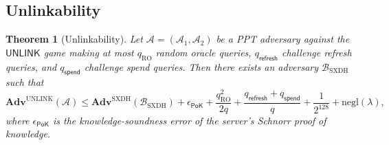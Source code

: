 \documentclass[11pt]{article}
\theoremstyle{definitionstyle}
\newtheorem{theorem}{Theorem}[section]
\theoremstyle{plain}
\newcommand{\advantage}[1]{\mathbf{Adv}^{\mathrm{#1}}}
\newcommand{\negl}{\mathrm{negl}}
\begin{document}
\subsection{Unlinkability}

\begin{theorem}[Unlinkability]
Let $\mathcal{A} = (\mathcal{A}_1, \mathcal{A}_2)$ be a PPT adversary against the $\mathsf{UNLINK}$ game making at most $q_{\text{RO}}$ random oracle queries, $q_{\mathsf{refresh}}$ challenge refresh queries, and $q_{\mathsf{spend}}$ challenge spend queries. Then there exists an adversary $\mathcal{B}_{\text{SXDH}}$ such that
\[
\advantage{UNLINK}(\mathcal{A}) \le \advantage{SXDH}(\mathcal{B}_{\text{SXDH}}) + \epsilon_{\mathsf{PoK}} + \frac{q_{\text{RO}}^2}{2q} + \frac{q_{\mathsf{refresh}}+q_{\mathsf{spend}}}{q} + \frac{1}{2^{128}} + \negl(\lambda),
\]
where $\epsilon_{\mathsf{PoK}}$ is the knowledge-soundness error of the server's Schnorr proof of knowledge.
\end{theorem}
\end{document}
